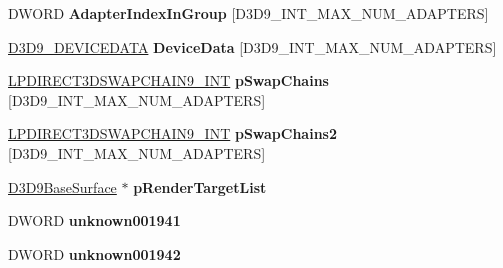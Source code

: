 \begin{DoxyCompactItemize}
\item 
\mbox{\label{struct___direct3_d_device9___i_n_t_a4e547dbcbbbace940086ce469e1b06a2}} 
D\+W\+O\+RD {\bfseries Adapter\+Index\+In\+Group} \mbox{[}D3\+D9\+\_\+\+I\+N\+T\+\_\+\+M\+A\+X\+\_\+\+N\+U\+M\+\_\+\+A\+D\+A\+P\+T\+E\+RS\mbox{]}
\item 
\mbox{\label{struct___direct3_d_device9___i_n_t_a577a16a241d7f36afaba092b5b8d7146}} 
\hyperlink{struct___d3_d9___d_e_v_i_c_e_d_a_t_a}{D3\+D9\+\_\+\+D\+E\+V\+I\+C\+E\+D\+A\+TA} {\bfseries Device\+Data} \mbox{[}D3\+D9\+\_\+\+I\+N\+T\+\_\+\+M\+A\+X\+\_\+\+N\+U\+M\+\_\+\+A\+D\+A\+P\+T\+E\+RS\mbox{]}
\item 
\mbox{\label{struct___direct3_d_device9___i_n_t_a2fbc608661d70dbafb99e32cea2218c5}} 
\hyperlink{struct___direct3_d_swap_chain9___i_n_t}{L\+P\+D\+I\+R\+E\+C\+T3\+D\+S\+W\+A\+P\+C\+H\+A\+I\+N9\+\_\+\+I\+NT} {\bfseries p\+Swap\+Chains} \mbox{[}D3\+D9\+\_\+\+I\+N\+T\+\_\+\+M\+A\+X\+\_\+\+N\+U\+M\+\_\+\+A\+D\+A\+P\+T\+E\+RS\mbox{]}
\item 
\mbox{\label{struct___direct3_d_device9___i_n_t_a44afea74311a4f7f403c4f450365fa2c}} 
\hyperlink{struct___direct3_d_swap_chain9___i_n_t}{L\+P\+D\+I\+R\+E\+C\+T3\+D\+S\+W\+A\+P\+C\+H\+A\+I\+N9\+\_\+\+I\+NT} {\bfseries p\+Swap\+Chains2} \mbox{[}D3\+D9\+\_\+\+I\+N\+T\+\_\+\+M\+A\+X\+\_\+\+N\+U\+M\+\_\+\+A\+D\+A\+P\+T\+E\+RS\mbox{]}
\item 
\mbox{\label{struct___direct3_d_device9___i_n_t_a3424f55ccb329031cd1f0955a364767f}} 
\hyperlink{struct___d3_d9_base_surface}{D3\+D9\+Base\+Surface} $\ast$ {\bfseries p\+Render\+Target\+List}
\item 
\mbox{\label{struct___direct3_d_device9___i_n_t_a2732d7709718415d753e0f655d9a69ed}} 
D\+W\+O\+RD {\bfseries unknown001941}
\item 
\mbox{\label{struct___direct3_d_device9___i_n_t_a9fd0d610d466244d30314f7b1450bf23}} 
D\+W\+O\+RD {\bfseries unknown001942}
\item 
\mbox{\label{struct___direct3_d_device9___i_n_t_a4df6740737bc6fb03556daee8b953571}} 

\end{DoxyCompactItemize}
